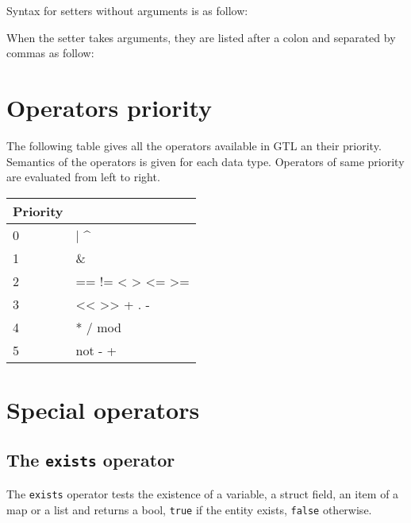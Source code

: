 \documentclass[10pt,openright,twosides]{report}
\newcommand{\gtlinline}[1]{\colorbox{light-blue}{\lstinline[language=gtl]{#1}}}
\begin{document}
\begin{gtl}
\end{gtl}

Syntax for setters without arguments is as follow:

\begin{gtl}
\end{gtl}

When the setter takes arguments, they are listed after a colon and separated by commas as follow:

\begin{gtl}
\end{gtl}

\section{Operators priority}

The following table gives all the operators available in GTL an their priority. Semantics of the operators is given for each data type. Operators of same priority are evaluated from left to right.

\begin{longtable}{l|>{\ttfamily}l}
{\bf Priority}&{\bf Operators}\\
\hline\endhead
 {0}&
  {| \^{}}\\
 {1}&
  {\&}\\
 {2}&
  {== != < > <= >=}\\
 {3}&
  {<< >> + . -}\\
 {4}&
  {* / mod}\\
 {5}&
  {not \raisebox{-1mm}{\textasciitilde} - +}\\
\end{longtable}

\section{Special operators}

\subsection{The \texttt{exists} operator}

The \gtlinline{exists} operator tests the existence of a variable, a struct field,  an item of a map or a list and returns a bool, \gtlinline{true} if the entity exists, \gtlinline{false} otherwise.
\end{document}
